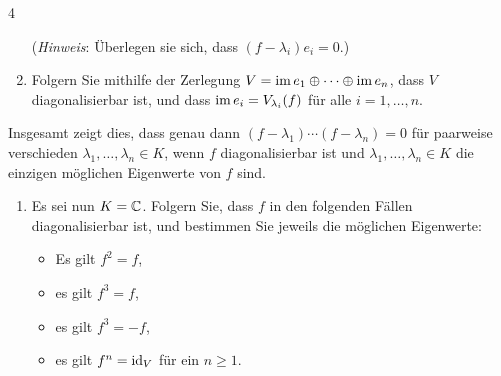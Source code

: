 \begin{question}[subtitle = Ein Kriterium für Diagonalisierbarkeit mithilfe von complete sets of orthogonal idempotents]{4}
\begin{enumerate}[resume]
      (\emph{Hinweis}:
       Überlegen sie sich, dass $(f - \lambda_i) e_i = 0$.)
    \item
      Folgern Sie mithilfe der Zerlegung $V = \operatorname{im} e_1 \oplus \dotsb \oplus \operatorname{im} e_n$, dass $V$ diagonalisierbar ist, und dass $\operatorname{im} e_i = V_{\lambda_i}(f)$ für alle $i = 1, \dotsc, n$.
  \end{enumerate}
  Insgesamt zeigt dies, dass genau dann $(f - \lambda_1) \dotsm (f - \lambda_n) = 0$ für paarweise verschieden $\lambda_1, \dotsc, \lambda_n \in K$, wenn $f$ diagonalisierbar ist und $\lambda_1, \dotsc, \lambda_n \in K$ die einzigen möglichen Eigenwerte von $f$ sind.
  \begin{enumerate}[resume]
    \item 
      Es sei nun $K = \mathbb{C}$.
      Folgern Sie, dass $f$ in den folgenden Fällen diagonalisierbar ist, und bestimmen Sie jeweils die möglichen Eigenwerte:
      \begin{itemize}
        \item
          Es gilt $f^2 = f$,
        \item
          es gilt $f^3 = f$,
        \item
          es gilt $f^3 = -f$,
        \item
          es gilt $f^n = \operatorname{id}_V$ für ein $n \geq 1$.
      \end{itemize}
  \end{enumerate}
\end{question}


